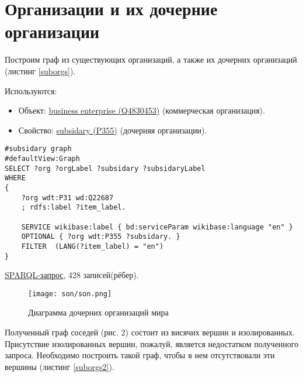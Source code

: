 \section*{Организации и их дочерние организации}

Построим граф из существующих организаций, а также их дочерних организаций (листинг \ref{suborgs}).

Используются:
\begin{itemize}
    \item Объект: \href{https://www.wikidata.org/wiki/Q4830453}{business enterprise (Q4830453)} (коммерческая организация).
    \item Свойство: \href{https://www.wikidata.org/wiki/Property:P355}{subsidary (P355)} (дочерняя организации).
\end{itemize}

\begin{lstlisting}[language=SPARQL,label=suborgs,caption=Построение графа родительских и дочерных организаций]
#subsidary graph
#defaultView:Graph
SELECT ?org ?orgLabel ?subsidary ?subsidaryLabel
WHERE
{
    ?org wdt:P31 wd:Q22687
    ; rdfs:label ?item_label.

    SERVICE wikibase:label { bd:serviceParam wikibase:language "en" }
    OPTIONAL { ?org wdt:P355 ?subsidary. }
    FILTER  (LANG(?item_label) = "en") 
}
\end{lstlisting}

\href{https://query.wikidata.org/#%23neighboring%20countries%20graph%0A%23defaultView%3AGraph%0ASELECT%20%3Forg%20%3ForgLabel%20%3Fsubsidary%20%3FsubsidaryLabel%0AWHERE%0A%7B%0A%20%20%20%20%3Forg%20wdt%3AP31%20wd%3AQ22687%0A%20%20%20%20%3B%20rdfs%3Alabel%20%3Fitem_label%20.%0A%0A%20%20%20%20SERVICE%20wikibase%3Alabel%20%7B%20bd%3AserviceParam%20wikibase%3Alanguage%20%22en%22%20%7D%0A%20%20%20%20OPTIONAL%20%7B%20%3Forg%20wdt%3AP355%20%3Fsubsidary%20.%20%7D%0A%20%20%20%20FILTER%20%20%28LANG%28%3Fitem_label%29%20%3D%20%22en%22%29%20%0A%7D%0A}{SPARQL-запрос}, 428 записей(рёбер).
	
\begin{figure}[h]
	\texttt{[image: son/son.png]}
	\centering
	\caption{Диаграмма дочерних организаций мира}
	\centering
\end{figure}

Полученный граф соседей (рис. 2) состоит из висячих вершин и изолированных. Присутствие изолированных вершин, пожалуй, является недостатком полученного запроса. Необходимо построить такой граф, чтобы в нем отсутствовали эти вершины (листинг \ref{suborgs2}).


